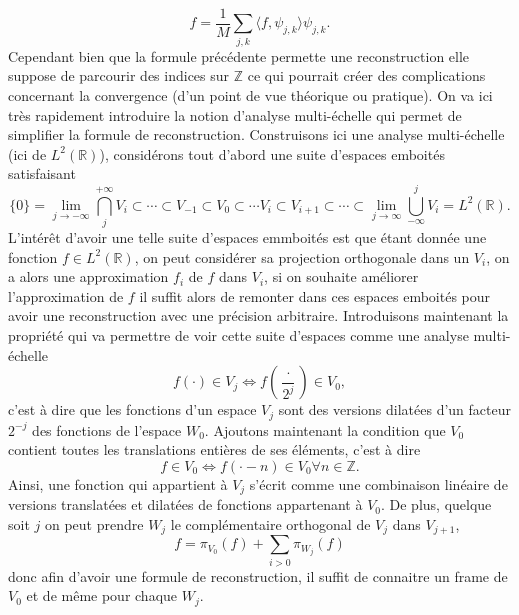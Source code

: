 \begin{equation}
	f = \frac{1}{M} \sum_{j,k} \langle f, \psi_{j,k}\rangle \psi_{j,k}.
\end{equation}
Cependant bien que la formule précédente permette une reconstruction elle suppose de parcourir des indices sur $\mathbb{Z}$ ce qui pourrait créer des complications concernant la convergence (d'un point de vue théorique ou pratique).
On va ici très rapidement introduire la notion d'analyse multi-échelle qui permet de simplifier la formule de reconstruction.
Construisons ici une analyse multi-échelle (ici de $L^2(\mathbb{R})$), considérons tout d'abord une suite d'espaces emboités satisfaisant 
\begin{equation*}
	\{0\}=	\lim_{j\to -\infty} \bigcap_{j}^{+\infty} V_i \subset \cdots \subset V_{-1} \subset V_0 \subset \cdots V_i \subset V_{i+1} \subset \cdots \subset \lim_{j\to \infty} \bigcup_{-\infty}^{j} V_i = L^2(\mathbb{R}).  
\end{equation*}
L'intérêt d'avoir une telle suite d'espaces emmboités est que étant donnée une fonction $f\in L^2(\mathbb{R})$, on peut considérer sa projection orthogonale dans un $V_i$, on a alors une approximation $f_i$ de $f$ dans $V_i$, si on souhaite améliorer l'approximation de $f$ il suffit alors de remonter dans ces espaces emboités pour avoir une reconstruction avec une précision arbitraire.
Introduisons maintenant la propriété qui va permettre de voir cette suite d'espaces comme une analyse multi-échelle
\begin{equation}
	f(\cdot) \in V_j \iff f(\frac{\cdot}{2^j}) \in V_0,
\end{equation}
c'est à dire que les fonctions d'un espace $V_j$ sont des versions dilatées d'un facteur $2^{-j}$ des fonctions de l'espace $W_0$.
Ajoutons maintenant la condition que $V_0$ contient toutes les translations entières de ses éléments, c'est à dire
\begin{equation}
	f \in V_0 \iff f(\cdot - n) \in V_0 \forall n \in \mathbb{Z}.
\end{equation}
Ainsi, une fonction qui appartient à $V_j$ s'écrit comme une combinaison linéaire de versions translatées et dilatées de fonctions appartenant à $V_0$.
De plus, quelque soit $j$ on peut prendre $W_j$ le complémentaire orthogonal de $V_j$ dans $V_{j+1}$, 
\begin{equation}
	f = \pi_{V_0}(f) +\sum_{i>0} \pi_{W_j}(f) 
\end{equation}
donc afin d'avoir une formule de reconstruction, il suffit de connaitre un frame de $V_0$ et de même pour chaque $W_j$. 
